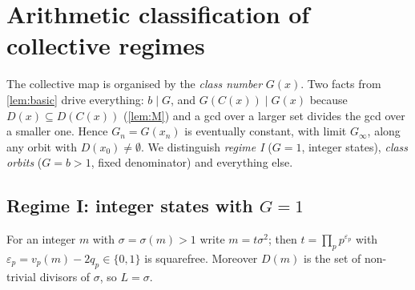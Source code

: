 \section{Arithmetic classification of collective regimes}\label{sec:regimes}
The collective map is organised by the \emph{class number} $G(x)$. Two facts from \cref{lem:basic} drive everything: $b\mid G$, and $G(C(x))\mid G(x)$ because $D(x)\subseteq D(C(x))$ (\cref{lem:M}) and a gcd over a larger set divides the gcd over a smaller one. Hence $G_n=G(x_n)$ is eventually constant, with limit $G_\infty$, along any orbit with $D(x_0)\ne\emptyset$. We distinguish \emph{regime I} ($G=1$, integer states), \emph{class orbits} ($G=b>1$, fixed denominator) and everything else.

\subsection{Regime I: integer states with \texorpdfstring{$G=1$}{G=1}}
For an integer $m$ with $\sigma=\sigma(m)>1$ write $m=t\sigma^2$; then $t=\prod_pp^{\varepsilon_p}$ with $\varepsilon_p=v_p(m)-2q_p\in\{0,1\}$ is squarefree. Moreover $D(m)$ is the set of non-trivial divisors of $\sigma$, so $L=\sigma$.

